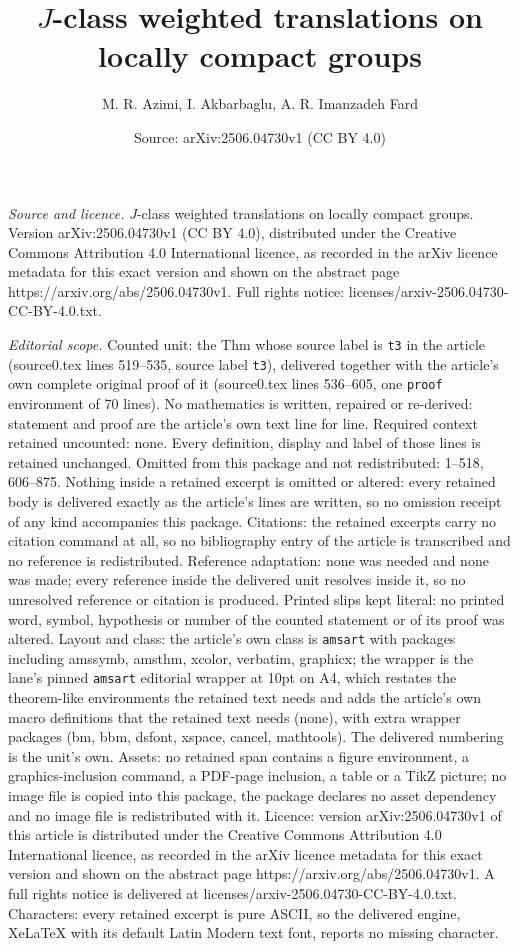 \documentclass[10pt,a4paper]{amsart}
\title[$J$-class weighted translations on locally compact groups]{$J$-class weighted translations on locally compact groups}
\author{M. R. Azimi, I. Akbarbaglu, A. R. Imanzadeh Fard}
\date{Source: arXiv:2506.04730v1 (CC BY 4.0)}
\begin{document}
\maketitle

\noindent\emph{Source and licence.} $J$-class weighted translations on locally compact groups. Version arXiv:2506.04730v1 (CC BY 4.0), distributed under the Creative Commons Attribution 4.0 International licence, as recorded in the arXiv licence metadata for this exact version and shown on the abstract page https://arxiv.org/abs/2506.04730v1. Full rights notice: licenses/arxiv-2506.04730-CC-BY-4.0.txt.\par\smallskip

\noindent\textit{Editorial scope.} Counted unit: the Thm whose source label is \texttt{t3} in the article (source0.tex lines 519--535, source label \texttt{t3}), delivered together with the article's own complete original proof of it (source0.tex lines 536--605, one \texttt{proof} environment of 70 lines). No mathematics is written, repaired or re-derived: statement and proof are the article's own text line for line. Required context retained uncounted: none. Every definition, display and label of those lines is retained unchanged. Omitted from this package and not redistributed: 1--518, 606--875. Nothing inside a retained excerpt is omitted or altered: every retained body is delivered exactly as the article's lines are written, so no omission receipt of any kind accompanies this package. Citations: the retained excerpts carry no citation command at all, so no bibliography entry of the article is transcribed and no reference is redistributed. Reference adaptation: none was needed and none was made; every reference inside the delivered unit resolves inside it, so no unresolved reference or citation is produced. Printed slips kept literal: no printed word, symbol, hypothesis or number of the counted statement or of its proof was altered. Layout and class: the article's own class is \texttt{amsart} with packages including amssymb, amsthm, xcolor, verbatim, graphicx; the wrapper is the lane's pinned \texttt{amsart} editorial wrapper at 10pt on A4, which restates the theorem-like environments the retained text needs and adds the article's own macro definitions that the retained text needs (none), with extra wrapper packages (bm, bbm, dsfont, xspace, cancel, mathtools). The delivered numbering is the unit's own. Assets: no retained span contains a figure environment, a graphics-inclusion command, a PDF-page inclusion, a table or a TikZ picture; no image file is copied into this package, the package declares no asset dependency and no image file is redistributed with it. Licence: version arXiv:2506.04730v1 of this article is distributed under the Creative Commons Attribution 4.0 International licence, as recorded in the arXiv licence metadata for this exact version and shown on the abstract page https://arxiv.org/abs/2506.04730v1. A full rights notice is delivered at licenses/arxiv-2506.04730-CC-BY-4.0.txt. Characters: every retained excerpt is pure ASCII, so the delivered engine, XeLaTeX with its default Latin Modern text font, reports no missing character.
\end{document}
